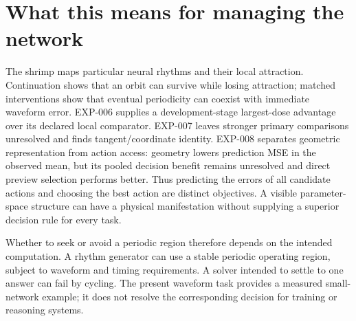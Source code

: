 \documentclass[11pt,letterpaper]{article}
\begin{document}




\section{What this means for managing the network}
The shrimp maps particular neural rhythms and their local attraction. Continuation shows that an orbit can survive while losing attraction; matched interventions show that eventual periodicity can coexist with immediate waveform error. EXP-006 supplies a development-stage largest-dose advantage over its declared local comparator. EXP-007 leaves stronger primary comparisons unresolved and finds tangent/coordinate identity. EXP-008 separates geometric representation from action access: geometry lowers prediction MSE in the observed mean, but its pooled decision benefit remains unresolved and direct preview selection performs better. Thus predicting the errors of all candidate actions and choosing the best action are distinct objectives. A visible parameter-space structure can have a physical manifestation without supplying a superior decision rule for every task.

Whether to seek or avoid a periodic region therefore depends on the intended computation. A rhythm generator can use a stable periodic operating region, subject to waveform and timing requirements. A solver intended to settle to one answer can fail by cycling. The present waveform task provides a measured small-network example; it does not resolve the corresponding decision for training or reasoning systems.
\end{document}
